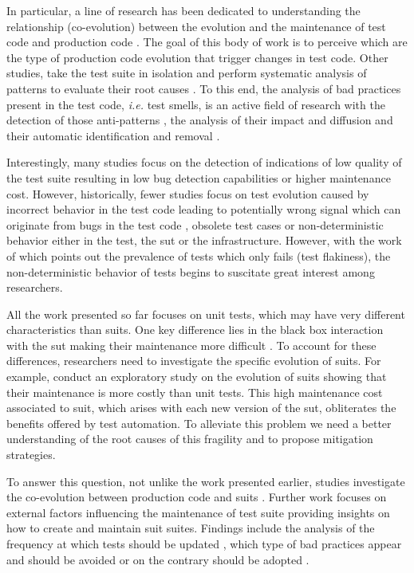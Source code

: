 In particular, a line of research has been dedicated to understanding the relationship (co-evolution) between the evolution and the maintenance of test code and production code \cite{Lamkanfi2010, Zaidman2011, Marsavina2014, Levin2017, Vidacs2018, Alenezi2019}. The goal of this body of work is to perceive which are the type of production code evolution that trigger changes in test code. Other studies, take the test suite in isolation and perform systematic analysis of patterns to evaluate their root causes \cite{Pinto2012}. To this end, the analysis of bad practices present in the test code, \emph{i.e.} test smells, is an active field of research with the detection of those anti-patterns \cite{VanDeursen2001, Bowes2017, Tufano2016}, the analysis of their impact and diffusion \cite{Bavota2015, Tufano2016, Kim2020} and their automatic identification and removal \cite{VanRompaey2007, Reichhart2007, Peruma2020}.

Interestingly, many studies focus on the detection of indications of low quality of the test suite resulting in low bug detection capabilities or higher maintenance cost. However, historically, fewer studies focus on test evolution caused by incorrect behavior in the test code leading to potentially wrong signal which can originate from bugs in the test code \cite{Vahabzadeh2015}, obsolete test cases \cite{Hao2013, Tang2015} or non-deterministic behavior either in the test, the \gls{sut} or the infrastructure. However, with the work of \textcite{Luo2014} which points out the prevalence of tests which only fails (test flakiness), the non-deterministic behavior of tests begins to suscitate great interest among researchers.

All the work presented so far focuses on unit tests, which may have very different characteristics than \gls{suit}s. One key difference lies in the black box interaction with the \gls{sut} making their maintenance more difficult \cite{Berner2005}. To account for these differences, researchers need to investigate the specific evolution of \gls{suit}s. For example, \textcite{Skoglund2004} conduct an exploratory study on the evolution of \gls{suit}s showing that their maintenance is more costly than unit tests. This high maintenance cost associated to \gls{suit}, which arises with each new version of the \gls{sut}, obliterates the benefits offered by test automation. To alleviate this problem we need a better understanding of the root causes of this fragility and to propose mitigation strategies.

To answer this question, not unlike the work presented earlier, studies investigate the co-evolution between production code and \gls{suit}s \cite{Shewchuk2010, Christophe2014}. Further work focuses on external factors influencing the maintenance of test suite \cite{Alegroth2013, Kan2013, Alegroth2016, Lavoie2017} providing insights on how to create and maintain \gls{suit} suites. Findings include the analysis of the frequency at which tests should be updated \cite{Alegroth2013, Alegroth2016}, which type of bad practices appear and should be avoided \cite{Chen2012, Lavoie2017} or on the contrary should be adopted \cite{Kan2013}.

